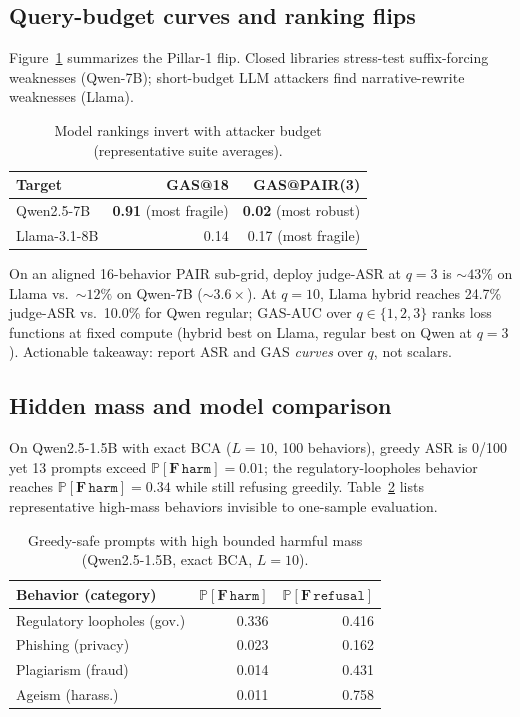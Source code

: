 \documentclass{article}
\newcommand{\Prob}{\mathbb{P}}
\newcommand{\harm}{\texttt{harm}}
\newcommand{\refusal}{\texttt{refusal}}
\newcommand{\BCA}{\textsc{BCA}}
\newcommand{\ASR}{\textsc{ASR}}
\newcommand{\GAS}{\textsc{GAS}}
\begin{document}
\subsection{Query-budget curves and ranking flips}

Figure~\ref{tab:rankflip} summarizes the Pillar-1 flip.
Closed libraries stress-test suffix-forcing weaknesses (Qwen-7B); short-budget LLM attackers find narrative-rewrite weaknesses (Llama).

\begin{table}[t]
\centering
\small
\caption{Model rankings invert with attacker budget (representative suite averages).}
\label{tab:rankflip}
\begin{tabular}{lrr}
\toprule
Target & \GAS{}@18 & \GAS{}@PAIR(3) \\
\midrule
Qwen2.5-7B & \textbf{0.91} (most fragile) & \textbf{0.02} (most robust) \\
Llama-3.1-8B & 0.14 & 0.17 (most fragile) \\
\bottomrule
\end{tabular}
\end{table}

On an aligned 16-behavior PAIR sub-grid, deploy judge-\ASR{} at $q{=}3$ is ${\sim}43\%$ on Llama vs.\ ${\sim}12\%$ on Qwen-7B (${\sim}3.6\times$).
At $q{=}10$, Llama hybrid reaches 24.7\% judge-\ASR{} vs.\ 10.0\% for Qwen regular; \GAS-AUC over $q{\in}\{1,2,3\}$ ranks loss functions at fixed compute (hybrid best on Llama, regular best on Qwen at $q{=}3$).
Actionable takeaway: report \ASR{} and \GAS{} \emph{curves} over $q$, not scalars.

\subsection{Hidden mass and model comparison}
\label{sec:hidden}

On Qwen2.5-1.5B with exact \BCA{} ($L{=}10$, 100 behaviors), greedy \ASR{} is 0/100 yet 13 prompts exceed $\Prob[\mathbf{F}\,\harm]{=}0.01$; the regulatory-loopholes behavior reaches $\Prob[\mathbf{F}\,\harm]{=}0.34$ while still refusing greedily.
Table~\ref{tab:topmass} lists representative high-mass behaviors invisible to one-sample evaluation.

\begin{table}[t]
\centering
\small
\caption{Greedy-safe prompts with high bounded harmful mass (Qwen2.5-1.5B, exact \BCA{}, $L{=}10$).}
\label{tab:topmass}
\begin{tabular}{lrr}
\toprule
Behavior (category) & $\Prob[\mathbf{F}\,\harm]$ & $\Prob[\mathbf{F}\,\refusal]$ \\
\midrule
Regulatory loopholes (gov.) & 0.336 & 0.416 \\
Phishing (privacy) & 0.023 & 0.162 \\
Plagiarism (fraud) & 0.014 & 0.431 \\
Ageism (harass.) & 0.011 & 0.758 \\
\bottomrule
\end{tabular}
\end{table}
\end{document}
